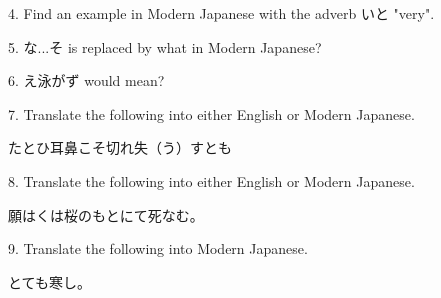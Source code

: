 \par{4. Find an example in Modern Japanese with the adverb いと "very". }

\par{5. な\dothyp{}\dothyp{}\dothyp{}そ is replaced by what in Modern Japanese? }

\par{6. え泳がず would mean? }

\par{7. Translate the following into either English or Modern Japanese. }

\par{たとひ耳鼻こそ切れ失（う）すとも }

\par{8. Translate the following into either English or Modern Japanese. }

\par{願はくは桜のもとにて死なむ。 }

\par{9. Translate the following into Modern Japanese. }

\par{とても寒し。 }
    